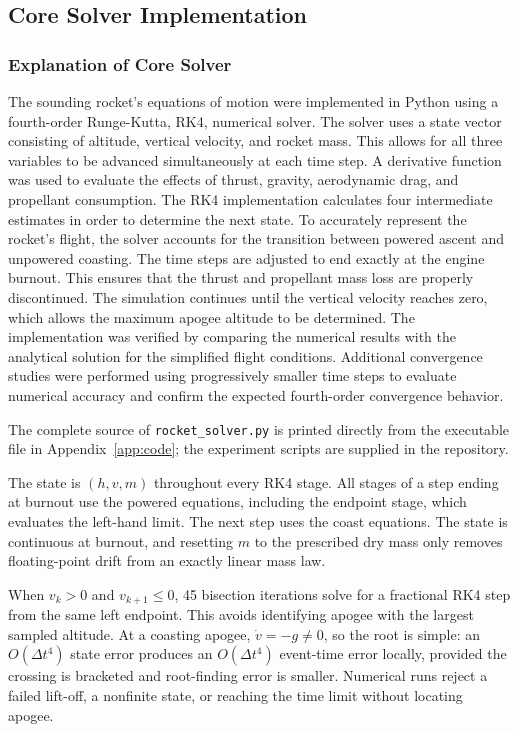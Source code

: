 \documentclass{article}
\begin{document}
\subsection{Core Solver Implementation}%

\subsubsection{Explanation of Core Solver}

    The sounding rocket's equations of motion were implemented in Python using a fourth-order Runge-Kutta, RK4, numerical solver. The solver uses a state vector consisting of altitude, vertical velocity, and rocket mass. This allows for all three variables to be advanced simultaneously at each time step. A derivative function was used to evaluate the effects of thrust, gravity, aerodynamic drag, and propellant consumption. The RK4 implementation calculates four intermediate estimates in order to determine the next state. 
    To accurately represent the rocket's flight, the solver accounts for the transition between powered ascent and unpowered coasting. The time steps are adjusted to end exactly at the engine burnout. This ensures that the thrust and propellant mass loss are properly discontinued. The simulation continues until the vertical velocity reaches zero, which allows the maximum apogee altitude to be determined. 
    The implementation was verified by comparing the numerical results with the analytical solution for the simplified flight conditions. Additional convergence studies were performed using progressively smaller time steps to evaluate numerical accuracy and confirm the expected fourth-order convergence behavior. 

The complete source of \texttt{rocket\_solver.py} is printed directly from the executable file in Appendix~\ref{app:code}; the experiment scripts are supplied in the repository. 

The state is $(h,v,m)$ throughout every RK4 stage. All stages of a step ending at burnout use the powered equations, including the endpoint stage, which evaluates the left-hand limit. The next step uses the coast equations. The state is continuous at burnout, and resetting $m$ to the prescribed dry mass only removes floating-point drift from an exactly linear mass law.

When $v_k>0$ and $v_{k+1}\leq0$, 45 bisection iterations solve for a fractional RK4 step from the same left endpoint. This avoids identifying apogee with the largest sampled altitude. At a coasting apogee, $\dot v=-g\ne0$, so the root is simple: an $O(\Delta t^4)$ state error produces an $O(\Delta t^4)$ event-time error locally, provided the crossing is bracketed and root-finding error is smaller. Numerical runs reject a failed lift-off, a nonfinite state, or reaching the time limit without locating apogee.
\end{document}
